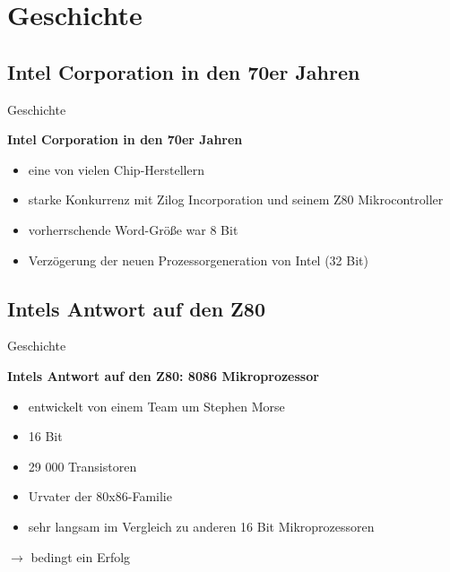 \section{Geschichte}

\subsection{Intel Corporation in den 70er Jahren}
\begin{frame}{Geschichte}
    \begin{center}
        \textbf{Intel Corporation in den 70er Jahren}
    \end{center}
    \begin{itemize}
        \item eine von vielen Chip-Herstellern
        \item starke Konkurrenz mit Zilog Incorporation und seinem Z80 Mikrocontroller
        \item vorherrschende Word-Größe war 8 Bit
        \item Verzögerung der neuen Prozessorgeneration von Intel (32 Bit)
    \end{itemize}
\end{frame}

\subsection{Intels Antwort auf den Z80}
\begin{frame}{Geschichte}
    \begin{center}
        \textbf{Intels Antwort auf den Z80: 8086 Mikroprozessor}
    \end{center}
    \begin{itemize}
        \item entwickelt von einem Team um Stephen Morse
        \item 16 Bit
        \item 29 000 Transistoren
        \item Urvater der 80x86-Familie
        \item sehr langsam im Vergleich zu anderen 16 Bit Mikroprozessoren
    \end{itemize}

    $\rightarrow$ bedingt ein Erfolg
\end{frame}

